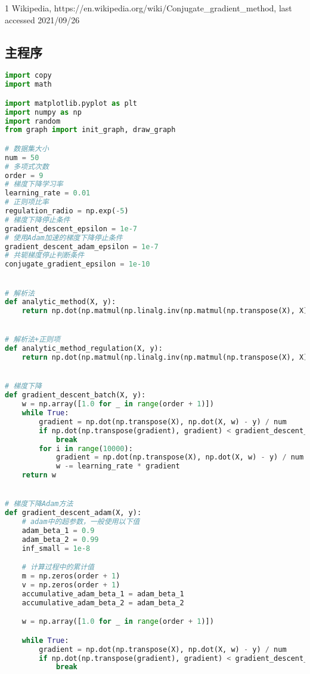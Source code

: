 \documentclass[withoutpreface,bwprint]{cumcmthesis}
\begin{document}
\begin{thebibliography}{1}
Wikipedia,
https://en.wikipedia.org/wiki/Conjugate\_gradient\_method,
last accessed 2021/09/26
\end{thebibliography}

\newpage
\begin{appendix}
\section{主程序}
\begin{lstlisting}[language=python]
import copy
import math

import matplotlib.pyplot as plt
import numpy as np
import random
from graph import init_graph, draw_graph

# 数据集大小
num = 50
# 多项式次数
order = 9
# 梯度下降学习率
learning_rate = 0.01
# 正则项比率
regulation_radio = np.exp(-5)
# 梯度下降停止条件
gradient_descent_epsilon = 1e-7
# 使用Adam加速的梯度下降停止条件
gradient_descent_adam_epsilon = 1e-7
# 共轭梯度停止判断条件
conjugate_gradient_epsilon = 1e-10


# 解析法
def analytic_method(X, y):
    return np.dot(np.matmul(np.linalg.inv(np.matmul(np.transpose(X), X)), np.transpose(X)), y)


# 解析法+正则项
def analytic_method_regulation(X, y):
    return np.dot(np.matmul(np.linalg.inv(np.matmul(np.transpose(X), X) + np.identity(order + 1, dtype=int) * regulation_radio), np.transpose(X)), y)


# 梯度下降
def gradient_descent_batch(X, y):
    w = np.array([1.0 for _ in range(order + 1)])
    while True:
        gradient = np.dot(np.transpose(X), np.dot(X, w) - y) / num
        if np.dot(np.transpose(gradient), gradient) < gradient_descent_epsilon:
            break
        for i in range(10000):
            gradient = np.dot(np.transpose(X), np.dot(X, w) - y) / num
            w -= learning_rate * gradient
    return w


# 梯度下降Adam方法
def gradient_descent_adam(X, y):
    # adam中的超参数，一般使用以下值
    adam_beta_1 = 0.9
    adam_beta_2 = 0.99
    inf_small = 1e-8

    # 计算过程中的累计值
    m = np.zeros(order + 1)
    v = np.zeros(order + 1)
    accumulative_adam_beta_1 = adam_beta_1
    accumulative_adam_beta_2 = adam_beta_2

    w = np.array([1.0 for _ in range(order + 1)])

    while True:
        gradient = np.dot(np.transpose(X), np.dot(X, w) - y) / num
        if np.dot(np.transpose(gradient), gradient) < gradient_descent_adam_epsilon:
            break


\end{lstlisting}
\end{appendix}
\end{document}
